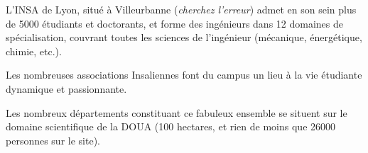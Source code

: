L'INSA de Lyon, situé à Villeurbanne (\emph{cherchez l'erreur}) admet en son sein plus
de 5000 étudiants et doctorants, et forme des ingénieurs dans 12 domaines de
spécialisation, couvrant toutes les sciences de l'ingénieur (mécanique,
énergétique, chimie, etc.).

\vspace{1em}

Les nombreuses associations Insaliennes font du campus un lieu à la vie
étudiante dynamique et passionnante.

\vspace{1em}

Les nombreux départements constituant ce fabuleux ensemble se situent sur le
domaine scientifique de la DOUA (100 hectares, et rien de moins que 26000 personnes sur le
site).
